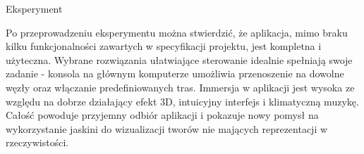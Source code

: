 \begin{chapter}{Eksperyment}

Po przeprowadzeniu eksperymentu można stwierdzić, że aplikacja, mimo braku kilku funkcjonalności zawartych w specyfikacji projektu, jest kompletna i użyteczna. Wybrane rozwiązania ułatwiające sterowanie idealnie spełniają swoje zadanie - konsola na głównym komputerze umożliwia przenoszenie na dowolne węzły oraz włączanie predefiniowanych tras. Immersja w aplikacji jest wysoka ze względu na dobrze działający efekt 3D, intuicyjny interfejs i klimatyczną muzykę. Całość powoduje przyjemny odbiór aplikacji i pokazuje nowy pomysł na wykorzystanie jaskini do wizualizacji tworów nie mających reprezentacji w rzeczywistości. 

\end{chapter}
